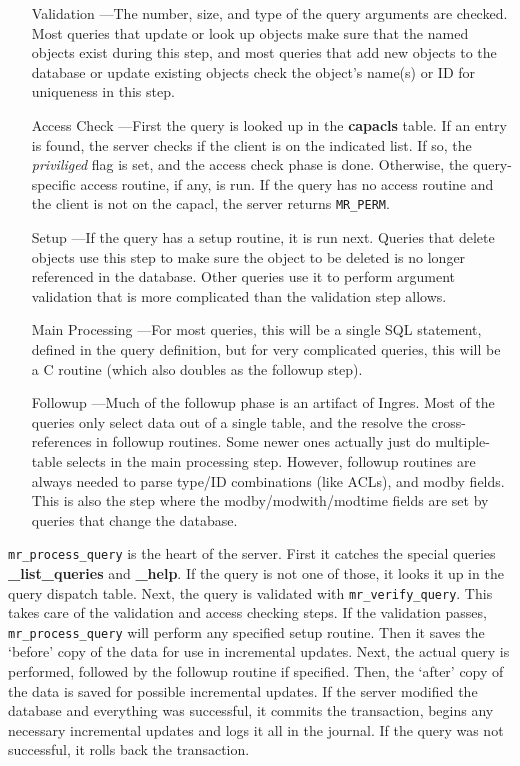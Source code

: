\begin{enumerate}
\item[Validation]---The number, size, and type of the query arguments
are checked. Most queries that update or look up objects make sure
that the named objects exist during this step, and most queries that
add new objects to the database or update existing objects check the
object's name(s) or ID for uniqueness in this step.

\item[Access Check]---First the query is looked up in the {\bf
capacls} table. If an entry is found, the server checks if the client
is on the indicated list. If so, the {\it priviliged\/} flag is set,
and the access check phase is done. Otherwise, the query-specific
access routine, if any, is run. If the query has no access routine and
the client is not on the capacl, the server returns {\tt MR_PERM}.

\item[Setup]---If the query has a setup routine, it is run next.
Queries that delete objects use this step to make sure the object to
be deleted is no longer referenced in the database. Other queries use
it to perform argument validation that is more complicated than the
validation step allows.

\item[Main Processing]---For most queries, this will be a single SQL
statement, defined in the query definition, but for very complicated
queries, this will be a C routine (which also doubles as the followup
step).

\item[Followup]---Much of the followup phase is an artifact of Ingres.
Most of the queries only select data out of a single table, and the
resolve the cross-references in followup routines. Some newer ones
actually just do multiple-table selects in the main processing step.
However, followup routines are always needed to parse type/ID
combinations (like ACLs), and modby fields. This is also the step
where the modby/modwith/modtime fields are set by queries that change
the database.
\end{enumerate}

{\tt mr\_process\_query} is the heart of the server. First it catches
the special queries {\bf \_list\_queries} and {\bf \_help}. If the
query is not one of those, it looks it up in the query dispatch table.
Next, the query is validated with {\tt mr\_verify\_query}. This takes
care of the validation and access checking steps. If the validation
passes, {\tt mr\_process\_query} will perform any specified setup
routine. Then it saves the `before' copy of the data for use in
incremental updates. Next, the actual query is performed, followed by
the followup routine if specified. Then, the `after' copy of the data
is saved for possible incremental updates. If the server modified the
database and everything was successful, it commits the transaction,
begins any necessary incremental updates and logs it all in the
journal. If the query was not successful, it rolls back the
transaction.

